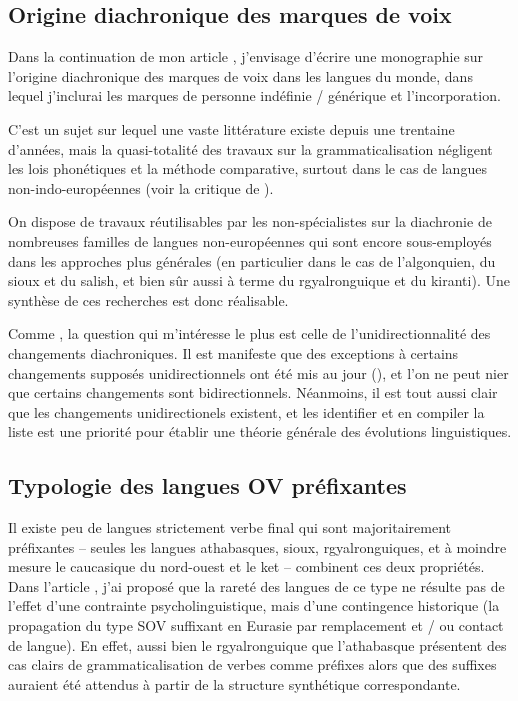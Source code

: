 \documentclass[oldfontcommands,oneside,a4paper,11pt]{article}
\begin{document}
 
 \subsection{Origine diachronique des marques de voix} 
Dans  la continuation de mon article \citet{jacques14antipassive}, j'envisage d'écrire une monographie sur l'origine diachronique des marques de voix dans les langues du monde, dans lequel j'inclurai les marques de personne indéfinie / générique et l'incorporation.

C'est un sujet sur lequel une vaste littérature  existe depuis une trentaine d'années, mais la quasi-totalité des travaux sur la grammaticalisation négligent les lois phonétiques et la méthode comparative, surtout dans le cas de langues non-indo-européennes (voir la critique de \citealt{heath98hermit}).

On dispose de travaux réutilisables par les non-spécialistes sur la diachronie de nombreuses familles de langues non-européennes qui sont encore sous-employés dans les approches plus générales (en particulier dans le cas de l'algonquien, du sioux et du salish, et bien sûr aussi à terme du rgyalronguique et du kiranti). Une synthèse de ces recherches est donc réalisable.

 Comme \citet{haspelmath90passive}, la question qui m'intéresse le plus est celle de l'unidirectionnalité des changements diachroniques. Il est manifeste que des exceptions à certains changements supposés unidirectionnels ont été mis au jour (\citealt{norde09degrammaticalization}), et  l'on ne peut nier que certains changements sont bidirectionnels. Néanmoins, il est tout aussi clair que les changements unidirectionels existent, et les identifier et en compiler la liste est une priorité pour établir une théorie générale des évolutions linguistiques.  
 
 
 
  \subsection{Typologie des langues OV préfixantes} 
 Il existe peu de langues strictement verbe final qui sont majoritairement préfixantes -- seules les langues athabasques, sioux, rgyalronguiques, et à moindre mesure le caucasique du nord-ouest et le ket -- combinent ces deux propriétés. Dans l'article  \citet{jacques13harmonization}, j'ai proposé que la rareté des langues de ce type ne résulte pas de l'effet d'une contrainte psycholinguistique, mais d'une contingence historique (la propagation du type SOV suffixant en Eurasie par remplacement et / ou contact de langue).  En effet, aussi bien le rgyalronguique que l'athabasque présentent des cas clairs de grammaticalisation de verbes comme préfixes alors que des suffixes auraient été attendus à partir de la structure synthétique correspondante.
 
\end{document}
